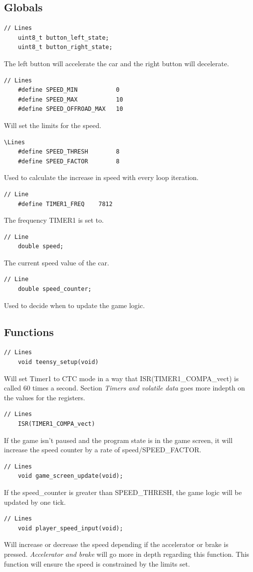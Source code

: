 \documentclass{article}
\begin{document}
\subsection*{Globals}
\begin{lstlisting}[style=CStyle]
	// Lines
	uint8_t button_left_state;
	uint8_t button_right_state;
\end{lstlisting}
The left button will accelerate the car and the right button will decelerate.
\begin{lstlisting}[style=CStyle]
	// Lines
	#define SPEED_MIN           0      
	#define SPEED_MAX           10
	#define SPEED_OFFROAD_MAX   10
\end{lstlisting}
Will set the limits for the speed.
\begin{lstlisting}[style=CStyle]
	\Lines 
	#define SPEED_THRESH        8
	#define SPEED_FACTOR        8
\end{lstlisting}
Used to calculate the increase in speed with every loop iteration.
\begin{lstlisting}[style=CStyle]
	// Line
	#define TIMER1_FREQ    7812
\end{lstlisting}
The frequency TIMER1 is set to. 
\begin{lstlisting}[style=CStyle]
	// Line
	double speed;
\end{lstlisting}
The current speed value of the car.
\begin{lstlisting}[style=CStyle]
	// Line
	double speed_counter;
\end{lstlisting}
Used to decide when to update the game logic. 
\newline

\subsection*{Functions}
\begin{lstlisting}[style=CStyle]
	// Lines
	void teensy_setup(void)
\end{lstlisting}
Will set Timer1 to CTC mode in a way that ISR(TIMER1\_COMPA\_vect) is called 60 times a second. Section \emph{Timers and volatile data} goes more indepth on the values for the registers. 
\begin{lstlisting}[style=CStyle]
	// Lines
	ISR(TIMER1_COMPA_vect)
\end{lstlisting}
If the game isn't paused and the program state is in the game screen, it will increase the speed counter by a rate of speed/SPEED\_FACTOR.
\begin{lstlisting}[style=CStyle]
	// Lines
	void game_screen_update(void);
\end{lstlisting}
If the speed\_counter is greater than SPEED\_THRESH, the game logic will be updated by one tick. 
\newpage
\begin{lstlisting}[style=CStyle]
	// Lines
	void player_speed_input(void);
\end{lstlisting}
Will increase or decrease the speed depending if the accelerator or brake is pressed. \emph{Accelerator and brake} will go more in depth regarding this function. This function will ensure the speed is constrained by the limits set.
\newline
\end{document}

